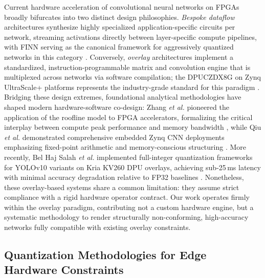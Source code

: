 \documentclass[algorithms,article,submit,moreauthors]{Definitions/mdpi}
\begin{document}
Current hardware acceleration of convolutional neural networks on FPGAs broadly bifurcates into two distinct design philosophies. \emph{Bespoke dataflow} architectures synthesize highly specialized application-specific circuits per network, streaming activations directly between layer-specific compute pipelines, with FINN serving as the canonical framework for aggressively quantized networks in this category \citep{bib5}. Conversely, \emph{overlay} architectures implement a standardized, instruction-programmable matrix and convolution engine that is multiplexed across networks via software compilation; the DPUCZDX8G on Zynq UltraScale+ platforms represents the industry-grade standard for this paradigm \citep{bib1} \citep{bib25}. Bridging these design extremes, foundational analytical methodologies have shaped modern hardware-software co-design: Zhang \textit{et al.} pioneered the application of the roofline model to FPGA accelerators, formalizing the critical interplay between compute peak performance and memory bandwidth \citep{bib6}, while Qiu \textit{et al.} demonstrated comprehensive embedded Zynq CNN deployments emphasizing fixed-point arithmetic and memory-conscious structuring \citep{bib7}. More recently, Bel Haj Salah \textit{et al.} implemented full-integer quantization frameworks for YOLOv10 variants on Kria KV260 DPU overlays, achieving sub-25\,ms latency with minimal accuracy degradation relative to FP32 baselines \citep{bib8}. Nonetheless, these overlay-based systems share a common limitation: they assume strict compliance with a rigid hardware operator contract. Our work operates firmly within the overlay paradigm, contributing not a custom hardware engine, but a systematic methodology to render structurally non-conforming, high-accuracy networks fully compatible with existing overlay constraints.

\subsection{Quantization Methodologies for Edge Hardware Constraints}
\end{document}
